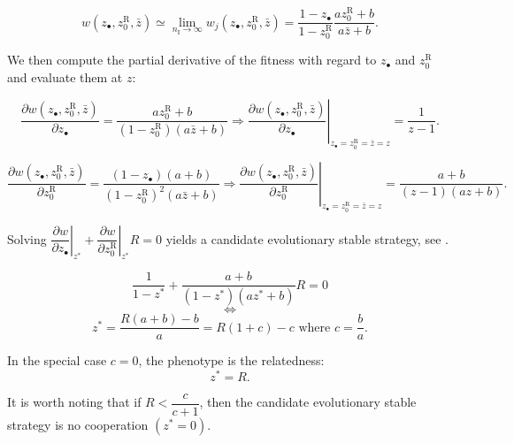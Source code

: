 \documentclass{article}
\newcommand{\nI}{{n_\textrm{I}}}
\begin{document}
  \begin{equation}
  w(z_\bullet ,z_0^{\mathrm{R}} , \bar{z} ) \simeq \lim_{\nI \rightarrow \infty} w_j(z_\bullet ,z_0^{\mathrm{R}} , \bar{z} ) = \dfrac{1-z_\bullet}{1- z_0^{\mathrm{R}}}\dfrac{a z_0^{\mathrm{R}} +b }{a \bar{z} +b}.
  \end{equation}
  
  We then compute the partial derivative of the fitness with regard to $z_\bullet$ and $z_0^{\mathrm{R}}$ and evaluate them at $z$:
  
  \begin{equation}
  \dfrac{\partial w(z_\bullet ,z_0^{\mathrm{R}} , \bar{z} )}{\partial z_\bullet} = \dfrac{a z_0^{\mathrm{R}} +b }{ (1 - z_0^{\mathrm{R}}) (a \bar{z} +b) } \Rightarrow \left. \dfrac{\partial w(z_\bullet ,z_0^{\mathrm{R}} , \bar{z} )}{\partial z_\bullet} \right\vert_{z_\bullet = z_0^{\mathrm{R}} = \bar{z}=z} = \dfrac{1}{ z-1 }.
  \end{equation}
  
  \begin{equation}
  \dfrac{\partial w(z_\bullet ,z_0^{\mathrm{R}} , \bar{z} )}{\partial z_0^{\mathrm{R}}} = \dfrac{(1- z_\bullet)(a +b)}{(1- z_0^{\mathrm{R}})^2(a \bar{z} +b)} \Rightarrow \left. \dfrac{\partial w(z_\bullet ,z_0^{\mathrm{R}} , \bar{z} )}{\partial z_0^{\mathrm{R}}} \right\vert_{z_\bullet = z_0^{\mathrm{R}} = \bar{z}=z} = \dfrac{a +b}{( z - 1 )(a z +b)}.
  \end{equation}
  
  Solving $\left. \dfrac{\partial w}{\partial z_\bullet} \right\vert_{z^*} + \left. \dfrac{\partial w}{\partial z_0^{\mathrm{R}}} \right\vert_{z^*} R =0 $ yields a candidate evolutionary stable strategy, see \cite{rousset2004genetic}.
  
    \begin{equation}
  \dfrac{1}{ 1 - z^* } + \dfrac{a +b}{(1- z^*)(a z^* +b)}R =0
  \end{equation}
  \begin{equation}
  \iff
  \end{equation}
  \begin{equation}
  z^*=\dfrac{R(a+b)-b}{a}=R(1+c)-c \text{ where }c=\dfrac{b}{a}.
  \end{equation}
  
  
  In the special case $c=0$, the phenotype is the relatedness:
  \begin{equation}
  z^*=R.
  \end{equation}
  
  
  It is worth noting that if $R<\dfrac{c}{c+1}$, then the candidate evolutionary stable strategy is no cooperation $(z^*=0)$.
\end{document}

